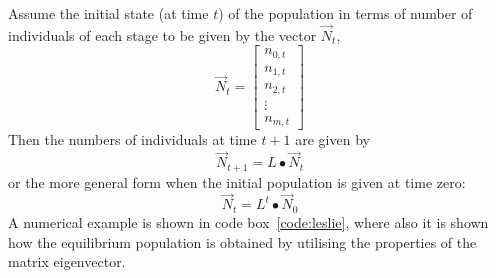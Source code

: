 \documentclass[11pt,fleqn]{book} %
\begin{document}
Assume the initial state (at time $t$) of the population in terms of number of individuals of each stage to be given by the vector $\vec{N}_t$,
\begin{equation}
\vec{N}_{t} = 
\begin{bmatrix}
    n_{0,t} \\
    n_{1,t} \\
    n_{2,t} \\
    \vdots \\
    n_{m,t}
\end{bmatrix}
\end{equation}
Then the numbers of individuals at time $t+1$ are given by
\begin{equation*}
 \vec{N}_{t+1} = L \bullet \vec{N}_{t}
\end{equation*}
or the more general form when the initial population is given at time zero:
\begin{equation}
 \vec{N}_{t} = L^t \bullet \vec{N}_{0}
\end{equation}
A numerical example is shown in code box~\ref{code:leslie}, where also it is shown how the equilibrium population is obtained by utilising the properties of the matrix eigenvector.
\end{document}

